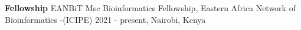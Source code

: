 


\begin{cvhonors}

  \cvhonor
    {\textbf{Fellowship}} %
    {EANBiT Msc Bioinformatics Fellowship, Eastern Africa Network of Bioinformatics -(ICIPE) } %
    {2021 - present, Nairobi, Kenya} %
    {}
    
\end{cvhonors}